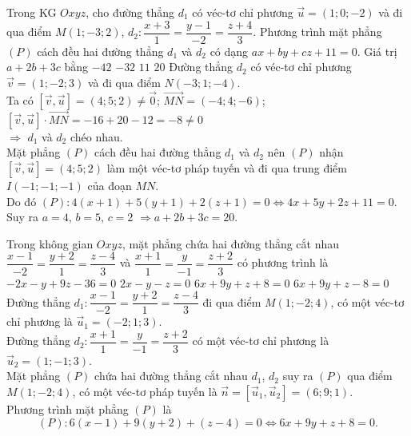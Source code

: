 \begin{ex}%
Trong KG $Oxyz$, cho đường thẳng $d_1$ có véc-tơ chỉ phương $\overrightarrow{u}=(1;0;-2)$ và đi qua điểm $M(1;-3;2)$, $d_2\colon\dfrac{x+3}{1}=\dfrac{y-1}{-2}=\dfrac{z+4}{3}$. Phương trình mặt phẳng $(P)$ cách đều hai đường thẳng $d_1$ và $d_2$ có dạng $ax+by+cz+11=0$. Giá trị $ a+2b+3c$ bằng
\choice
{$-42$}
{$-32$}
{$ 11$}
{\True $20$}
\loigiai
{
Đường thẳng $d_2$ có véc-tơ chỉ phương $\overrightarrow{v}=(1;-2;3)$ và đi qua điểm $ N(-3;1;-4)$.\\
Ta có $\left[\overrightarrow{v},\overrightarrow{u}\right]=(4;5;2)\ne\overrightarrow{0}$; $\overrightarrow{MN}=\left(-4;4;-6\right)$; $\left[\overrightarrow{v},\overrightarrow{u}\right]\cdot \overrightarrow{MN}=-16+20-12=-8\ne 0$\\
$\Rightarrow $ $d_1$ và $d_2$ chéo nhau.\\
Mặt phẳng $(P)$ cách đều hai đường thẳng $d_1$ và $d_2$ nên $(P)$ nhận $\left[\overrightarrow{v},\overrightarrow{u}\right]=(4;5;2)$ làm một véc-tơ pháp tuyến và đi qua trung điểm $ I(-1;-1;-1)$ của đoạn $ MN$.\\
Do đó $(P)\colon 4\left(x+1\right)+5\left(y+1\right)+2\left(z+1\right)=0\Leftrightarrow 4x+5y+2z+11=0$.\\
Suy ra $ a=4$, $b=5$, $c=2$ $\Rightarrow a+2b+3c=20$.}
\end{ex}

\begin{ex}%
Trong không gian $ Oxyz$, mặt phẳng chứa hai đường thẳng cắt nhau\break $\dfrac{x-1}{-2}=\dfrac{y+2}{1}=\dfrac{z-4}{3}$ và $\dfrac{x+1}{1}=\dfrac{y}{-1}=\dfrac{z+2}{3}$ có phương trình là
\choice
{$-2x-y+9z-36=0$}
{$ 2x-y-z=0$}
{\True $ 6x+9y+z+8=0$}
{$ 6x+9y+z-8=0$}
\loigiai
{
Đường thẳng $d_1\colon\dfrac{x-1}{-2}=\dfrac{y+2}{1}=\dfrac{z-4}{3}$ đi qua điểm $ M(1;-2;4)$, có một véc-tơ chỉ phương là $\overrightarrow{u}_1=(-2;1;3)$.\\
Đường thẳng $d_2\colon\dfrac{x+1}{1}=\dfrac{y}{-1}=\dfrac{z+2}{3}$ có một véc-tơ chỉ phương là $\overrightarrow{u}_2=(1;-1;3)$.\\
Mặt phẳng $(P)$ chứa hai đường thẳng cắt nhau $d_1$, $d_2$ suy ra $(P)$ qua điểm $ M(1;-2;4)$, có một véc-tơ pháp tuyến là $\overrightarrow{n}=\left[\overrightarrow{u}_1,\overrightarrow{u}_2\right]=(6;9;1)$.\\ Phương trình mặt phẳng $(P)$ là 
$$(P)\colon 6(x-1)+9(y+2)+(z-4)=0\Leftrightarrow 6x+9y+z+8=0.$$}
\end{ex}

